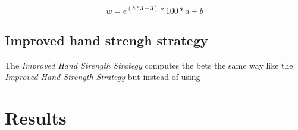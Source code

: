 \begin{equation}
	\label{equ:handStrength1}
	w = e^{(h * 3 - 3)} * 100 * a + b
\end{equation}

\subsection{Improved hand strengh strategy}
The \emph{Improved Hand Strength Strategy} computes the bets the same way like the \emph{Improved Hand Strength Strategy} but instead of using 

\section{Results}
